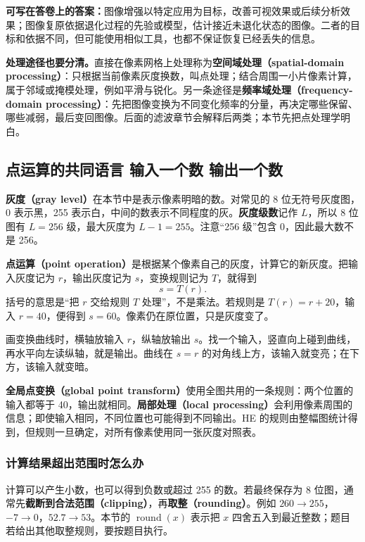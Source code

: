 \textbf{可写在答卷上的答案：}图像增强以特定应用为目标，改善可视效果或后续分析效果；图像复原依据退化过程的先验或模型，估计接近未退化状态的图像。二者的目标和依据不同，但可能使用相似工具，也都不保证恢复已经丢失的信息。

\textbf{处理途径也要分清。}直接在像素网格上处理称为\textbf{空间域处理（spatial-domain processing）}：只根据当前像素灰度换数，叫点处理；结合周围一小片像素计算，属于邻域或掩模处理，例如平滑与锐化。另一条途径是\textbf{频率域处理（frequency-domain processing）}：先把图像变换为不同变化频率的分量，再决定哪些保留、哪些减弱，最后变回图像。后面的滤波章节会解释后两类；本节先把点处理学明白。

\subsection{点运算的共同语言 输入一个数 输出一个数}

\textbf{灰度（gray level）}在本节中是表示像素明暗的数。对常见的 8 位无符号灰度图，0 表示黑，255 表示白，中间的数表示不同程度的灰。\textbf{灰度级数}记作 $L$，所以 8 位图有 $L=256$ 级，最大灰度为 $L-1=255$。注意“256 级”包含 0，因此最大数不是 256。

\textbf{点运算（point operation）}是根据某个像素自己的灰度，计算它的新灰度。把输入灰度记为 $r$，输出灰度记为 $s$，变换规则记为 $T$，就得到
\[
s=T(r).
\]
括号的意思是“把 $r$ 交给规则 $T$ 处理”，不是乘法。若规则是 $T(r)=r+20$，输入 $r=40$，便得到 $s=60$。像素仍在原位置，只是灰度变了。

画变换曲线时，横轴放输入 $r$，纵轴放输出 $s$。找一个输入，竖直向上碰到曲线，再水平向左读纵轴，就是输出。曲线在 $s=r$ 的对角线上方，该输入就变亮；在下方，该输入就变暗。

\textbf{全局点变换（global point transform）}使用全图共用的一条规则：两个位置的输入都等于 40，输出就相同。\textbf{局部处理（local processing）}会利用像素周围的信息；即使输入相同，不同位置也可能得到不同输出。HE 的规则由整幅图统计得到，但规则一旦确定，对所有像素使用同一张灰度对照表。

\subsubsection*{计算结果超出范围时怎么办}

计算可以产生小数，也可以得到负数或超过 255 的数。若最终保存为 8 位图，通常先\textbf{截断到合法范围（clipping）}，再\textbf{取整（rounding）}。例如 $260\to255$，$-7\to0$，$52.7\to53$。本节的 $\operatorname{round}(x)$ 表示把 $x$ 四舍五入到最近整数；题目若给出其他取整规则，要按题目执行。

